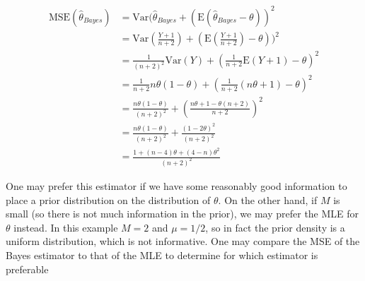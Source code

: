 \documentclass[12pt]{article}
\begin{document}
\begin{flushleft}
\begin{enumerate}
\begin{equation} 
\begin{split}
\mathrm{MSE}(\hat{\theta}_{Bayes} ) & = \mathrm{Var} (\hat{\theta}_{Bayes} + ( \mathrm{E} (\hat{\theta}_{Bayes} - \theta) ) ^2\\
 & =  \mathrm{Var} (\frac{Y+1}{n+2}) + ( \mathrm{E} (\frac{Y+1}{n+2}) - \theta) ) ^2\\
&= \frac{1}{(n+2)^2} \mathrm{Var} (Y) + (\frac{1}{n+2} \mathrm{E} (Y+1) - \theta)^2 \\
&= \frac{1}{n+2} n \theta (1- \theta) + ( \frac{1}{n+2} (n \theta +1 ) - \theta)^2 \\
&= \frac{n \theta (1- \theta)}{(n+2)^2} + (\frac{n \theta + 1 -\theta(n+2)}{n+2})^2\\
&= \frac{n \theta (1- \theta)}{(n+2)^2} + \frac{(1 - 2 \theta)^2}{(n+2)^2}\\
&= \frac{1 + (n-4)\theta + (4-n)\theta^2}{(n+2)^2}
\end{split}
\end{equation}

One may prefer this estimator if we have some reasonably good information to place a prior distribution on the distribution of $\theta$. On the other hand, if $M$ is small (so there is not much information in the prior), we may prefer the MLE for $\theta$ instead. In this example $M=2$ and $\mu = 1/2$, so in fact the prior density is a uniform distribution, which is not informative. One may compare the MSE of the Bayes estimator to that of the MLE to determine for which estimator is preferable






\end{enumerate}
\end{flushleft}
\end{document}
